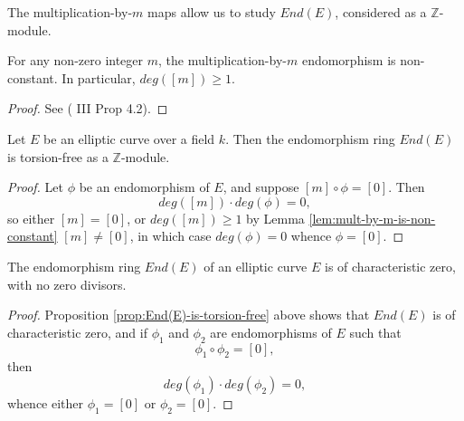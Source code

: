 The multiplication-by-$m$ maps allow us to study $End(E)$, considered as a
$\mathbb{Z}$-module.

\begin{lem}
  \label{lem:mult-by-m-is-non-constant}
  For any non-zero integer $m$, the multiplication-by-$m$ endomorphism is
  non-constant.  In particular, $deg([m]) \geq 1$.
\end{lem}
\begin{proof}
  See (\cite{silverman86} III Prop 4.2).
\end{proof}

\begin{prop}
  \label{prop:End(E)-is-torsion-free}
  Let $E$ be an elliptic curve over a field $k$.  Then the endomorphism ring $End(E)$
  is torsion-free as a $\mathbb{Z}$-module.
\end{prop}
\begin{proof}
  Let $\phi$ be an endomorphism of $E$, and suppose $[m] \circ \phi = [0]$.  Then
  \begin{equation*}
    deg([m])\cdot deg(\phi) = 0,
  \end{equation*}
  so either $[m] = [0]$, or $deg([m]) \geq 1$ by Lemma
  \ref{lem:mult-by-m-is-non-constant} $[m] \neq [0]$, in which case $deg(\phi) = 0$
  whence $\phi = [0]$.
\end{proof}

\begin{cor}
  \label{cor:End(E)-is-char-zero-with-no-zero-divisors}
  The endomorphism ring $End(E)$ of an elliptic curve $E$ is of characteristic zero,
  with no zero divisors.
\end{cor}
\begin{proof}
  Proposition \ref{prop:End(E)-is-torsion-free} above shows that $End(E)$ is of
  characteristic zero, and if $\phi_{1}$ and $\phi_{2}$ are endomorphisms of $E$ such
  that
  \begin{equation*}
    \phi_{1} \circ \phi_{2} = [0],
  \end{equation*}
  then
  \begin{equation*}
    deg(\phi_{1}) \cdot deg(\phi_{2}) = 0,
  \end{equation*}
  whence either $\phi_{1} = [0]$ or $\phi_{2} = [0]$.
\end{proof}


